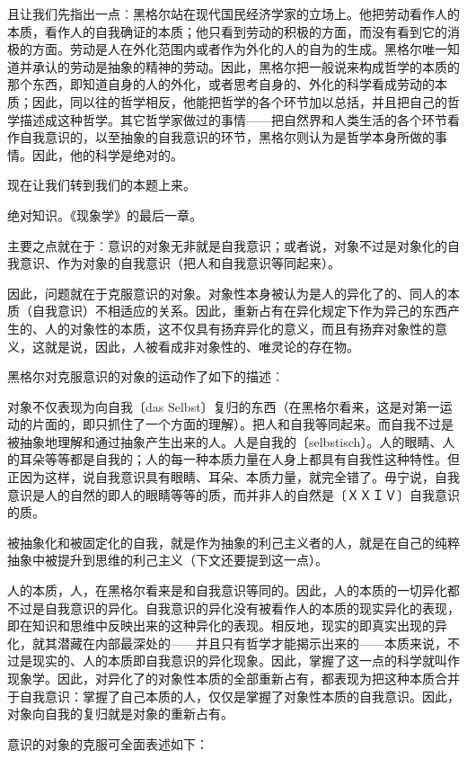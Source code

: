 \documentclass[a4paper,twoside,12pt,AutoFakeBold]{ctexart}
\begin{document}
且让我们先指出一点︰黑格尔站在现代国民经济学家的立场上。他把劳动看作人的本质，看作人的自我确证的本质；他只看到劳动的积极的方面，而没有看到它的消极的方面。劳动是人在外化范围内或者作为外化的人的自为的生成。黑格尔唯一知道并承认的劳动是抽象的精神的劳动。因此，黑格尔把一般说来构成哲学的本质的那个东西，即知道自身的人的外化，或者思考自身的、外化的科学看成劳动的本质；因此，同以往的哲学相反，他能把哲学的各个环节加以总括，并且把自己的哲学描述成这种哲学。其它哲学家做过的事情——把自然界和人类生活的各个环节看作自我意识的，以至抽象的自我意识的环节，黑格尔则认为是哲学本身所做的事情。因此，他的科学是绝对的。

现在让我们转到我们的本题上来。

绝对知识。《现象学》的最后一章。

主要之点就在于︰意识的对象无非就是自我意识；或者说，对象不过是对象化的自我意识、作为对象的自我意识（把人和自我意识等同起来）。

因此，问题就在于克服意识的对象。对象性本身被认为是人的异化了的、同人的本质（自我意识）不相适应的关系。因此，重新占有在异化规定下作为异己的东西产生的、人的对象性的本质，这不仅具有扬弃异化的意义，而且有扬弃对象性的意义，这就是说，因此，人被看成非对象性的、唯灵论的存在物。

黑格尔对克服意识的对象的运动作了如下的描述︰

对象不仅表现为向自我〔das Selbst〕复归的东西（在黑格尔看来，这是对第一运动的片面的，即只抓住了一个方面的理解）。把人和自我等同起来。而自我不过是被抽象地理解和通过抽象产生出来的人。人是自我的〔selbstisch〕。人的眼睛、人的耳朵等等都是自我的；人的每一种本质力量在人身上都具有自我性这种特性。但正因为这样，说自我意识具有眼睛、耳朵、本质力量，就完全错了。毋宁说，自我意识是人的自然的即人的眼睛等等的质，而并非人的自然是〔ＸＸＩＶ〕自我意识的质。

被抽象化和被固定化的自我，就是作为抽象的利己主义者的人，就是在自己的纯粹抽象中被提升到思维的利己主义（下文还要提到这一点）。

人的本质，人，在黑格尔看来是和自我意识等同的。因此，人的本质的一切异化都不过是自我意识的异化。自我意识的异化没有被看作人的本质的现实异化的表现，即在知识和思维中反映出来的这种异化的表现。相反地，现实的即真实出现的异化，就其潜藏在内部最深处的——并且只有哲学才能揭示出来的——本质来说，不过是现实的、人的本质即自我意识的异化现象。因此，掌握了这一点的科学就叫作现象学。因此，对异化了的对象性本质的全部重新占有，都表现为把这种本质合并于自我意识：掌握了自己本质的人，仅仅是掌握了对象性本质的自我意识。因此，对象向自我的复归就是对象的重新占有。

意识的对象的克服可全面表述如下：
\end{document}
